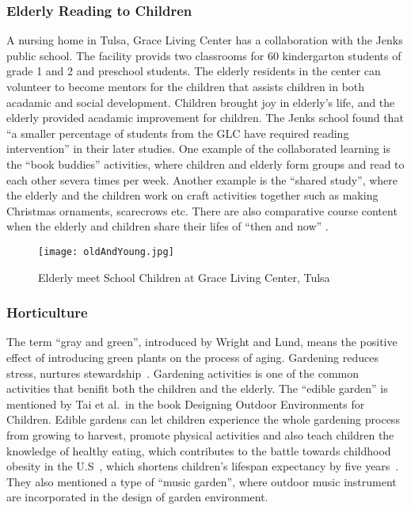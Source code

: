 \subsubsection{Elderly Reading to Children}
A nursing home in Tulsa, Grace Living Center has a collaboration with the Jenks public school. The facility provids two classrooms for 60 kindergarton students  of grade 1 and 2 and preschool students. The elderly residents in the center can volunteer to become mentors for the children that assists children in both acadamic and social development. Children brought joy in elderly's life, and the elderly provided acadamic improvement for children. The Jenks school found that ``a smaller percentage of students from the GLC have required reading intervention'' in their later studies. One example of the collaborated learning is the ``book buddies'' activities, where children and elderly form groups and read to each other severa times per week. Another example is the ``shared study'', where the elderly and the children work on craft activities together such as making Christmas ornaments, scarecrows etc. There are also comparative course content when the elderly and children share their lifes of ``then and now'' \cite{Morehouse2009}.
\begin{figure}[htbp]
  \centering
  \texttt{[image: oldAndYoung.jpg]}
  \caption[Ageless Friendship]{Elderly meet School Children at Grace
    Living Center, Tulsa~\cite{Parker2009}}
  \label{fig:oldAndYoung}
\end{figure}
\subsubsection{Horticulture}
The term ``gray and green'', introduced by Wright and
Lund, means the positive effect of introducing
green plants on the process of aging. Gardening reduces stress,
nurtures stewardship~\cite{Wright2000229}. Gardening activities is one
of the common activities that benifit both the children and the
elderly. The ``edible garden'' is mentioned by Tai et al.\ in the book
Designing Outdoor Environments for Children. Edible gardens can let
children experience the whole gardening process from growing to
harvest, promote physical activities and also teach children the
knowledge of healthy eating, which contributes to the battle towards
childhood obesity in the U.S~\cite{Tai2006}, which shortens children's
lifespan expectancy by five years~\cite{Souterbrown2015}. They also mentioned a
type of ``music garden'', where outdoor music instrument are
incorporated in the design of garden environment.


